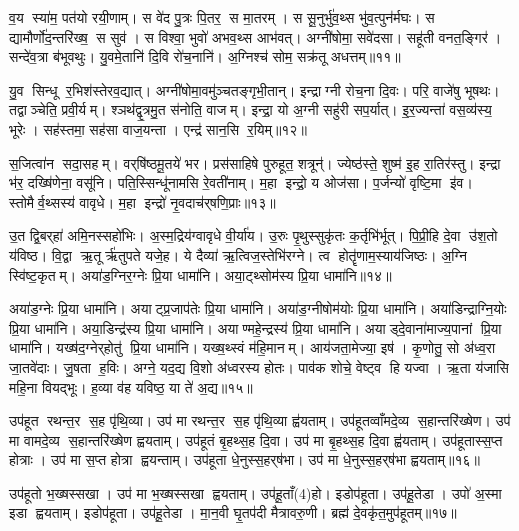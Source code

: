 व॒य स्या॑म॒ पत॑यो रयी॒णाम्। स वे॑द पु॒त्रः पि॒तर॒ स मा॒तरम्। स सू॒नुर्भु॑व॒थ्स भु॑व॒त्पुन॑र्मघः। स द्यामौर्णो॑द॒न्तरि॑ख्ष॒ स सुव॑। स विश्वा॒ भुवो॑ अभव॒थ्स आभ॑वत्। अग्नी॑षोमा॒ सवे॑दसा। सहू॑ती वनत॒ङ्गिर॑। सन्दे॑व॒त्रा ब॑भूवथुः। यु॒वमे॒तानि॑ दि॒वि रो॑च॒नानि॑। अ॒ग्निश्च॑ सोम॒ सक्र॑तू अधत्तम्॥११॥

यु॒व सिन्धू र॒भिश॑स्तेरव॒द्यात्। अग्नी॑षोमा॒वमु॑ञ्चतङ्गृभी॒तान्। इन्द्राग्नी रोच॒ना दि॒वः। परि॒ वाजे॑षु भूषथः। तद्वाञ्चेति॒ प्रवी॒र्यम्। श्ञथ॑द्वृ॒त्रमु॒त स॑नोति॒ वाजम्। इन्द्रा॒ यो अ॒ग्नी सहु॑री सप॒र्यात्। इ॒र॒ज्यन्ता॑ वस॒व्य॑स्य॒ भूरेः। सह॑स्तमा॒ सह॑सा वाज॒यन्ता। एन्द्र॑ सान॒सि र॒यिम्॥१२॥

स॒जित्वा॑न सदा॒सहम्। वर्‌षि॑ष्ठमू॒तये॑ भर। प्रस॑साहिषे पुरुहूत॒ शत्रून्॑। ज्येष्ठ॑स्ते॒ शुष्म॑ इ॒ह रा॒तिर॑स्तु। इन्द्रा भ॑र॒ दख्षि॑णेना॒ वसू॑नि। पति॒स्सिन्धू॑नामसि रे॒वती॑नाम्। म॒हा इन्द्रो॒ य ओज॑सा। प॒र्जन्यो॑ वृष्टि॒मा इ॑व। स्तोमैर्व॒थ्सस्य॑ वावृधे। म॒हा इन्द्रो॑ नृ॒वदाच॑र्‌षणि॒प्राः॥१३॥

उ॒त द्वि॒बर्‌हा॑ अमि॒नस्सहो॑भिः। अ॒स्म॒द्रिय॑ग्वावृधे वी॒र्या॑य। उ॒रुः पृ॒थुस्सुकृ॑तः क॒र्तृभि॑र्भूत्। पि॒प्री॒हि दे॒वा उ॑श॒तो य॑विष्ठ। वि॒द्वा ऋ॒तूर्\mbox{}ऋ॑तुपते यजे॒ह। ये दैव्या॑ ऋ॒त्विज॒स्तेभि॑रग्ने। त्व होतॄ॑णाम॒स्याय॑जिष्ठः। अ॒ग्नि स्वि॑ष्ट॒कृतम्। अया॑ड॒ग्निर॒ग्नेः प्रि॒या धामा॑नि। अया॒ट्थ्सोम॑स्य प्रि॒या धामा॑नि॥१४॥

अया॑ड॒ग्नेः प्रि॒या धामा॑नि। अयाट्प्र॒जाप॑तेः प्रि॒या धामा॑नि। अया॑ड॒ग्नीषोम॑योः प्रि॒या धामा॑नि। अया॑डिन्द्राग्नि॒योः प्रि॒या धामा॑नि। अया॒डिन्द्र॑स्य प्रि॒या धामा॑नि। अयाण्महे॒न्द्रस्य॑ प्रि॒या धामा॑नि। अयाड्दे॒वाना॑माज्य॒पानां प्रि॒या धामा॑नि। यख्ष॑द॒ग्नेर्‌होतु॑ प्रि॒या धामा॑नि। यख्ष॒थ्स्वं म॑हि॒मानम्। आय॑जता॒मेज्या॒ इष॑। कृ॒णोतु॒ सो अ॑ध्व॒रा जा॒तवे॑दाः। जु॒षता ह॒विः। अग्ने॒ यद॒द्य वि॒शो अ॑ध्वरस्य होतः। पाव॑क शोचे॒ वेष्ट्व हि यज्वा। ऋ॒ता य॑जासि महि॒ना वियद्भूः। ह॒व्या व॑ह यविष्ठ॒ या ते॑ अ॒द्य॥१५॥\anuvakamend[अ॒स्त्व॒ध॒त्त॒ र॒यिञ्च॑र्‌षणि॒प्रास्सोम॑स्य प्रि॒या धामा॒नीष॒ष्षट्च॑]

उप॑हूत रथन्त॒र स॒ह पृ॑थि॒व्या। उप॑ मा रथन्त॒र स॒ह पृ॑थि॒व्या ह्व॑यताम्। उप॑हूतव्वाँमदे॒व्य स॒हान्तरि॑ख्षेण। उप॑ मा वामदे॒व्य स॒हान्तरि॑ख्षेण ह्वयताम्। उप॑हूतं बृ॒हथ्स॒ह दि॒वा। उप॑ मा बृ॒हथ्स॒ह दि॒वा ह्व॑यताम्। उप॑हूतास्स॒प्त होत्राः। उप॑ मा स॒प्त होत्रा ह्वयन्ताम्। उप॑हूता धे॒नुस्स॒हर्‌ष॑भा। उप॑ मा धे॒नुस्स॒हर्‌ष॑भा ह्वयताम्॥१६॥

उप॑हूतो भ॒ख्षस्सखा। उप॑ मा भ॒ख्षस्सखा ह्वयताम्। उप॑हू॒ताँ(4)हो। इडोप॑हूता। उप॑हू॒तेडा। उपो॑ अ॒स्मा इडा ह्वयताम्। इडोप॑हूता। उप॑हू॒तेडा। मा॒न॒वी घृ॒तप॑दी मैत्रावरु॒णी। ब्रह्म॑ दे॒वकृ॑त॒मुप॑हूतम्॥१७॥


